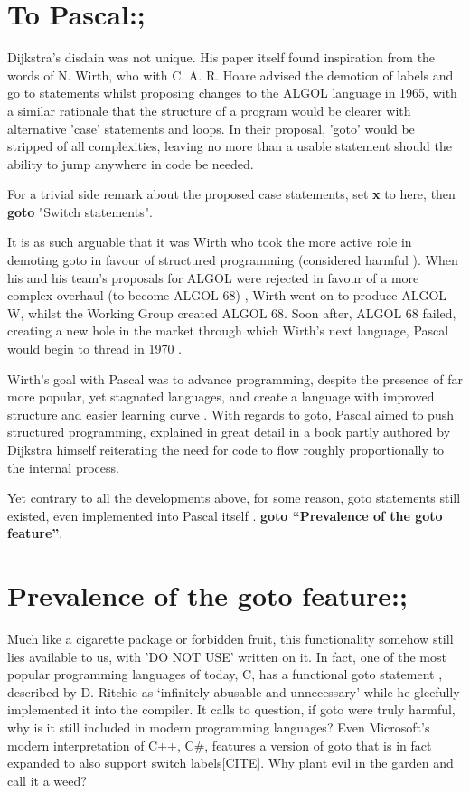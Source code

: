 \documentclass{journal}
\begin{document}
\section{To Pascal:;}
Dijkstra's disdain was not unique. His paper itself found inspiration from the words of N. Wirth, who with C. A. R. Hoare \cite{algolwirth} advised the demotion of labels and go to statements whilst proposing changes to the ALGOL language in 1965, with a similar rationale that the structure of a program would be clearer with alternative 'case' statements and loops. In their proposal, 'goto' would be stripped of all complexities, leaving no more than a usable statement should the ability to jump anywhere in code be needed.

For a trivial side remark about the proposed case statements, set \textbf{x} to here, then \textbf{goto} "Switch statements".

It is as such arguable that it was Wirth who took the more active role in demoting goto in favour of structured programming (considered harmful \cite{harmfulstructure}). When his and his team's proposals for ALGOL were rejected in favour of a more complex overhaul (to become ALGOL 68) \cite{pascalrecollections}, Wirth went on to produce ALGOL W, whilst the Working Group created ALGOL 68. Soon after, ALGOL 68 failed, creating a new hole in the market through which Wirth's next language, Pascal \cite{pascal} would begin to thread in 1970 \cite{pascalrecollections}.

Wirth's goal with Pascal was to advance programming, despite the presence of far more popular, yet stagnated languages, and create a language with improved structure and easier learning curve \cite{pascal}. With regards to goto, Pascal aimed to push structured programming, explained in great detail in a book partly authored by Dijkstra himself \cite{structured} reiterating the need for code to flow roughly proportionally to the internal process.

Yet contrary to all the developments above, for some reason, goto statements still existed, even implemented into Pascal itself \cite{pascal}. \textbf{goto ``Prevalence of the goto feature''}.

\section{Prevalence of the goto feature:;}
Much like a cigarette package or forbidden fruit, this functionality somehow still lies available to us, with 'DO NOT USE' written on it.  In fact, one of the most popular programming languages of today, C, has a functional goto statement \cite{cprogramming}, described by D. Ritchie as `infinitely abusable and unnecessary' \cite{cprogramming} while he gleefully implemented it into the compiler. It calls to question, if goto were truly harmful, why is it still included in modern programming languages? Even Microsoft's modern interpretation of C++, C\#, features a version of goto that is in fact expanded to also support switch labels[CITE]. Why plant evil in the garden and call it a weed?
\end{document}
